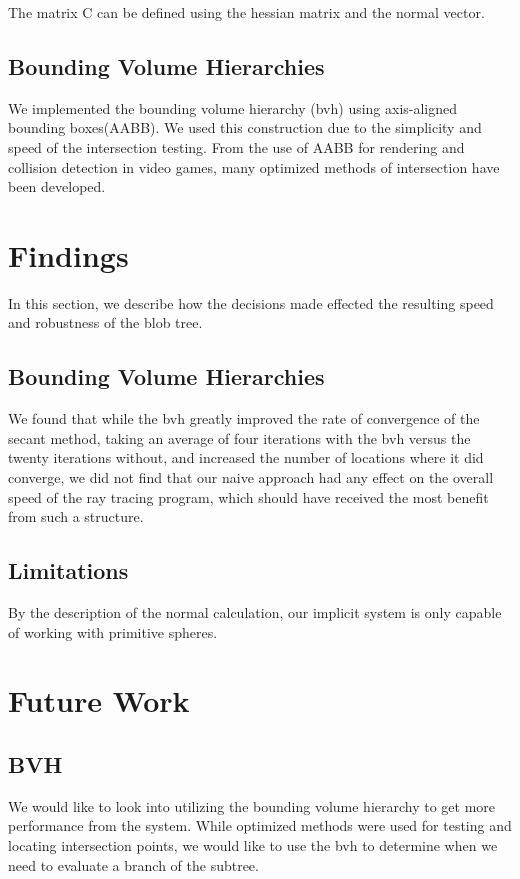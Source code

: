 \documentclass[conference]{acmsiggraph}
\begin{document}
The matrix C can be defined using the hessian matrix and the normal vector.

\subsection{Bounding Volume Hierarchies}
We implemented the bounding volume hierarchy (bvh) using axis-aligned bounding
boxes(AABB). We used this construction due to the simplicity and speed of the
intersection testing. From the use of AABB for rendering and collision
detection in video games, many optimized methods of intersection have been
developed\cite{Williams}.


\section{Findings}
In this section, we describe how the decisions made effected the resulting
speed and robustness of the blob tree.

\subsection{Bounding Volume Hierarchies}
We found that while the bvh greatly improved the rate of convergence of the
secant method, taking an average of four iterations with the bvh versus the
twenty iterations without, and increased the number of locations where it did
converge, we did not find that our naive approach had any effect on the overall
speed of the ray tracing program, which should have received the most benefit
from such a structure.

\subsection{Limitations}
By the description of the normal calculation, our implicit system is only
capable of working with primitive spheres.

\section{Future Work}
\subsection{BVH}
We would like to look into utilizing the bounding volume hierarchy to get more
performance from the system. While optimized methods were used for testing and
locating intersection points, we would like to use the bvh to determine when we
need to evaluate a branch of the subtree.
\end{document}
